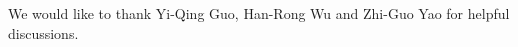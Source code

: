 \documentclass[12pt,prd,showpacs,amsmath,amssymb,aps,floats,floatfix,nofootinbib]{revtex4-1}
\begin{document}


\begin{acknowledgments}
We would like to thank Yi-Qing Guo, Han-Rong Wu and Zhi-Guo Yao for helpful discussions.
\end{acknowledgments}
\end{document}
